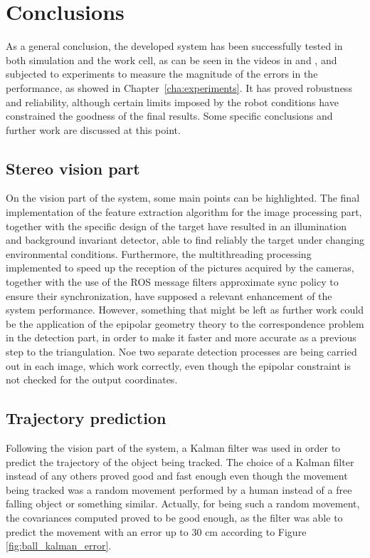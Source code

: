 
\chapter{Conclusions} %
\label{cha:conclusions}
As a general conclusion, the developed system has been successfully tested in both simulation and the work cell, as can be seen in the videos in \cite{results1} and \cite{results2}, and subjected to experiments to measure the magnitude of the errors in the performance, as showed in Chapter~\ref{cha:experiments}.
It has proved robustness and reliability, although certain limits imposed by the robot conditions have constrained the goodness of the final results. Some specific conclusions and further work are discussed at this point.

\section{Stereo vision part}
On the vision part of the system, some main points can be highlighted.
The final implementation of the feature extraction algorithm for the image processing part, together with the specific design of the target have resulted in an illumination and background invariant detector, able to find reliably the target under changing environmental conditions.
Furthermore, the multithreading processing implemented to speed up the reception of the pictures acquired by the cameras, together with the use of the ROS message filters approximate sync policy to ensure their synchronization, have supposed a relevant enhancement of the system performance.
However, something that might be left as further work could be the application of the epipolar geometry theory to the correspondence problem in the detection part, in order to make it faster and more accurate as a previous step to the triangulation.
Noe two separate detection processes are being carried out in each image, which work correctly, even though the epipolar constraint is not checked for the output coordinates.

\section{Trajectory prediction}
Following the vision part of the system, a Kalman filter was used in order to predict the trajectory of the object being tracked.
The choice of a Kalman filter instead of any others proved good and fast enough even though the movement being tracked was a random movement performed by a human instead of a free falling object or something similar. Actually, for being such a random movement, the covariances computed proved to be good enough, as the filter was able to predict the movement with an error up to 30 cm according to Figure \ref{fig:ball_kalman_error}.

